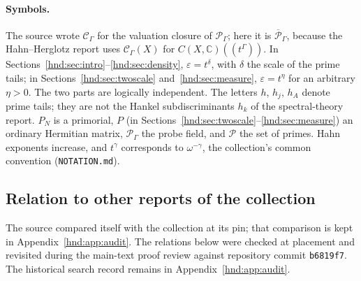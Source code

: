 \documentclass[11pt,oneside]{article}
\theoremstyle{definition}
\theoremstyle{remark}
\newcommand{\C}{\mathbb C}
\newcommand{\Pfield}{\mathscr P_\Gamma}
\newcommand{\eps}{\varepsilon}
\newcommand{\primes}{\mathcal P}
\newcommand{\repo}[1]{\nolinkurl{#1}}%
\begin{document}
\paragraph{Symbols.} The source wrote $\mathscr C_\Gamma$ for the valuation
closure of $\Pfield$; here it is $\overline{\mathscr P}_\Gamma$, because
the Hahn--Herglotz report uses $\mathscr C_\Gamma(X)$ for
$C(X,\C)((t^\Gamma))$. In Sections~\ref{hnd:sec:intro}--\ref{hnd:sec:density},
$\eps=t^\delta$, with $\delta$ the scale of the prime tails; in
Sections~\ref{hnd:sec:twoscale} and~\ref{hnd:sec:measure},
$\eps=t^\eta$ for an arbitrary $\eta>0$. The two parts are logically
independent. The letters $h$, $h_j$, $h_A$ denote prime tails; they are not
the Hankel subdiscriminants $h_k$ of the spectral-theory report. $P_N$ is a
primorial, $P$ (in Sections~\ref{hnd:sec:twoscale}--\ref{hnd:sec:measure})
an ordinary Hermitian matrix, $\Pfield$ the probe field, and $\primes$ the
set of primes. Hahn exponents increase, and $t^\gamma$ corresponds to
$\omega^{-\gamma}$, the collection's common convention (\repo{NOTATION.md}).

\subsection{Relation to other reports of the collection}\label{hnd:sec:position}

The source compared itself with the collection at its pin; that comparison
is kept in Appendix~\ref{hnd:app:audit}. The relations below were checked
at placement and revisited during the main-text proof review against
repository commit \texttt{b6819f7}. The historical search record remains
in Appendix~\ref{hnd:app:audit}.
\end{document}
